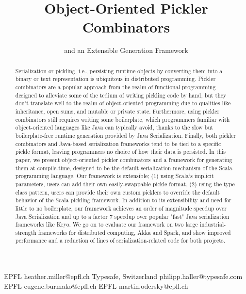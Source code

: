 \documentclass[preprint,10pt]{sigplanconf}
\begin{document}
\copyrightdata{[to be supplied]}


\title{Object-Oriented Pickler Combinators}
\subtitle{and an Extensible Generation Framework}

           {EPFL}
           {heather.miller@epfl.ch}
           {Typesafe, Switzerland}
           {philipp.haller@typesafe.com}
           {EPFL}
           {eugene.burmako@epfl.ch}
           {EPFL}
           {martin.odersky@epfl.ch}

\maketitle

\begin{abstract}
Serialization or pickling, i.e., persisting runtime objects by converting them
into a binary or text representation is ubiquitous in distributed programming.
Pickler combinators are a popular approach from the realm of functional
programming designed to alleviate some of the tedium of writing pickling code
by hand, but they don't translate well to the realm of object-oriented
programming due to qualities like inheritance, open sums, and mutable or
private state. Furthermore, using pickler combinators still requires writing
some boilerplate, which programmers familiar with object-oriented languages
like Java can typically avoid, thanks to the slow but boilerplate-free runtime
generation provided by Java Serialization. Finally, both pickler combinators
and Java-based serialization frameworks tend to be tied to a specific pickle
format, leaving programmers no choice of how their data is persisted. In this
paper, we present object-oriented pickler combinators and a framework for
generating them at compile-time, designed to be the default serialization
mechanism of the Scala programming language. Our framework is extensible; (1)
using Scala's implicit parameters, users can add their own easily-swappable
pickle format, (2) using the type class pattern, users can provide their own
custom picklers to override the default behavior of the Scala pickling
framework. In addition to its extensibility and need for little to no
boilerplate, our framework achieves an order of magnitude speedup over Java
Serialization and up to a factor 7 speedup over popular "fast" Java
serialization frameworks like Kryo. We go on to evaluate our framework on two
large industrial-strength frameworks for distributed computing, Akka and
Spark, and show improved performance and a reduction of lines of
serialization-related code for both projects.
\end{abstract}
\end{document}
